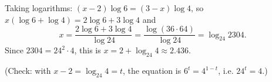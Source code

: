 Taking logarithms: $(x-2)\log6=(3-x)\log4$, so $x(\log6+\log4)=2\log6+3\log4$ and
\[x=\dfrac{2\log6+3\log4}{\log24}=\dfrac{\log(36\cdot64)}{\log24}=\log_{24}2304.\]
Since $2304=24^2\cdot4$, this is $x=\boxed{2+\log_{24}4}\approx2.436$.

(Check: with $x-2=\log_{24}4=t$, the equation is $6^t=4^{1-t}$, i.e. $24^t=4$.)
